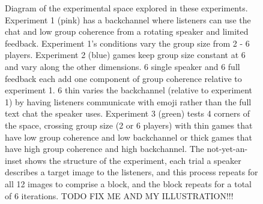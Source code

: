 \documentclass[
  english,
  a4paper,
]{article}
\begin{document}
\begin{figure}
    
\caption{ Diagram of the experimental space explored in these experiments. Experiment 1 (pink) has a backchannel where listeners can use the chat and low group coherence from a rotating speaker and limited feedback. Experiment 1's conditions vary the group size from 2 - 6 players. Experiment 2 (blue) games keep group size constant at 6 and vary along the other dimensions. 6 single speaker and 6 full feedback each add one component of group coherence relative to experiment 1. 6 thin varies the backchannel (relative to experiment 1) by having listeners communicate with emoji rather than the full text chat the speaker uses. Experiment 3 (green) tests 4 corners of the space, crossing group size (2 or 6 players) with thin games that have low group coherence and low backchannel or thick games that have high group coherence and high backchannel.  The not-yet-an-inset shows the structure of the experiment, each trial a speaker describes a target image to the listeners, and this process repeats for all 12 images to comprise a block, and the block repeats for a total of 6 iterations. TODO FIX ME AND MY ILLUSTRATION!!! }
    \label{diagram}
\end{figure}
\end{document}

